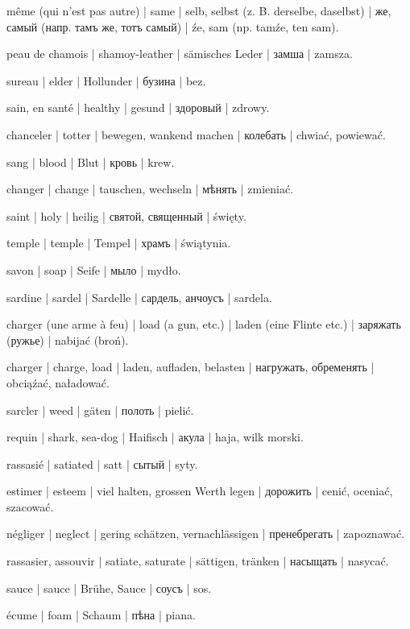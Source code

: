 \begin{outdent}{1em}
même (qui n’est pas autre) | same | selb, selbst
(z. B. derselbe, daselbst) | же, самый (напр. тамъ же, тотъ самый) | źe, sam (np. tamźe, ten sam).

peau de chamois | shamoy-leather | sämisches Leder | замша | zamsza.

sureau | elder | Hollunder | бузина | bez.

sain, en santé | healthy | gesund | здоровый | zdrowy.

chanceler | totter | bewegen, wankend machen | колебать | chwiać, powiewać.

sang | blood | Blut | кровь | krew.

changer | change | tauschen, wechseln | мѣнять | zmieniać.

saint | holy | heilig | святой, священный | święty.

\uvsubentry{}
temple | temple | Tempel | храмъ | świątynia.

savon | soap | Seife | мыло | mydło.

sardine | sardel | Sardelle | сардель, анчоусъ | sardela.

charger (une arme à feu) | load (a gun, etc.) | laden (eine Flinte etc.) | заряжать (ружье) | nabijać (broń).

charger | charge, load | laden, aufladen, belasten | нагружать, обременять | obciąźać, naładować.

sarcler | weed | gäten | полоть | pielić.

requin | shark, sea-dog | Haifisch | акула | haja, wilk
morski.

rassasié | satiated | satt | сытый | syty.

estimer | esteem | viel halten, grossen Werth legen | дорожить | cenić, oceniać, szacować.

\uvsubentry{}
négliger | neglect | gering schätzen, vernachlässigen | пренебрегать | zapoznawać.

rassasier, assouvir | satiate, saturate | sättigen, tränken | насыщать | nasycać.

sauce | sauce | Brühe, Sauce | соусъ | sos.

écume | foam | Schaum | пѣна | piana.


\end{outdent}
